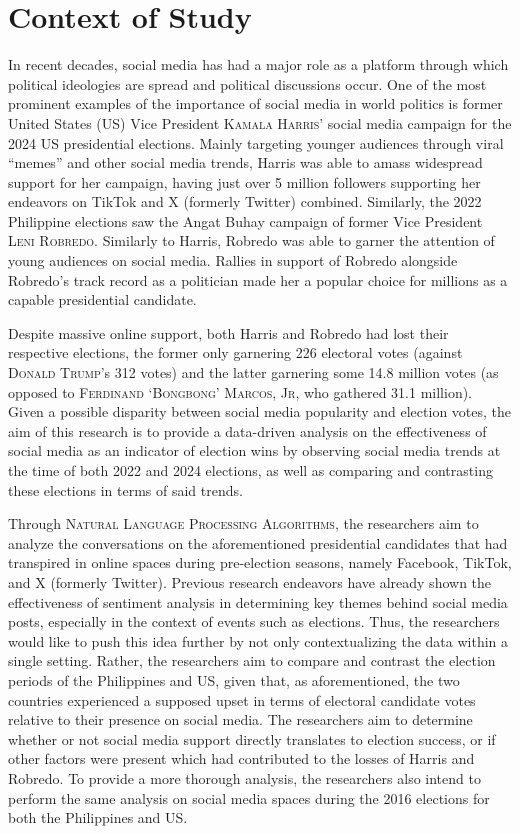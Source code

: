 
\section{Context of Study}
In recent decades, social media has had a major role as a platform through which political ideologies are spread and political discussions occur. One of the most prominent examples of the importance of social media in world politics is former United States (US) Vice President \textsc{Kamala Harris}’ social media campaign for the 2024 US presidential elections. Mainly targeting younger audiences through viral “memes” and other social media trends, Harris was able to amass widespread support for her campaign, having just over 5 million followers supporting her endeavors on TikTok and X (formerly Twitter) combined.\cite{CTX_Lee-2024} Similarly, the 2022 Philippine elections saw the Angat Buhay campaign of former Vice President \textsc{Leni Robredo}. Similarly to Harris, Robredo was able to garner the attention of young audiences on social media. Rallies in support of Robredo alongside Robredo’s track record as a politician made her a popular choice for millions as a capable presidential candidate.\cite{CTX_Johnson-2022}

Despite massive online support, both Harris and Robredo had lost their respective elections, the former only garnering 226 electoral votes (against \textsc{Donald Trump}’s 312 votes) and the latter garnering some 14.8 million votes (as opposed to \textsc{Ferdinand ‘Bongbong’ Marcos, Jr}, who gathered 31.1 million).\cite{CTX_ABSCBN-2022,CTX_BBC-2024} Given a possible disparity between social media popularity and election votes, the aim of this research is to provide a data-driven analysis on the effectiveness of social media as an indicator of election wins by observing social media trends at the time of both 2022 and 2024 elections, as well as comparing and contrasting these elections in terms of said trends.

Through \textsc{Natural Language Processing Algorithms}, the researchers aim to analyze the conversations on the aforementioned presidential candidates that had transpired in online spaces during pre-election seasons, namely Facebook, TikTok, and X (formerly Twitter). Previous research endeavors have already shown the effectiveness of sentiment analysis in determining key themes behind social media posts, especially in the context of events such as elections. Thus, the researchers would like to push this idea further by not only contextualizing the data within a single setting. Rather, the researchers aim to compare and contrast the election periods of the Philippines and US, given that, as aforementioned, the two countries experienced a supposed upset in terms of electoral candidate votes relative to their presence on social media. The researchers aim to determine whether or not social media support directly translates to election success, or if other factors were present which had contributed to the losses of Harris and Robredo. To provide a more thorough analysis, the researchers also intend to perform the same analysis on social media spaces during the 2016 elections for both the Philippines and US.
